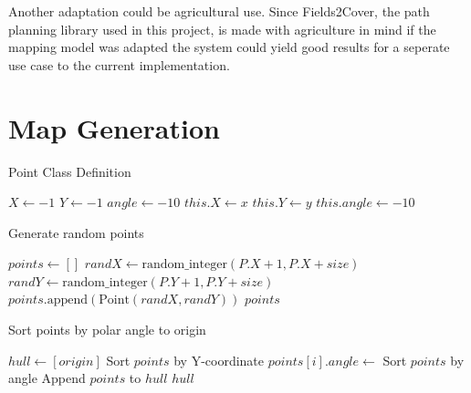 \documentclass[final]{cmpreport_02}
\begin{document}
Another adaptation could be agricultural use. 
Since Fields2Cover, the path planning library used in this project, is made with agriculture in mind if the mapping model was adapted the system could yield good results for a seperate use case to the current implementation.



\clearpage



\appendix
\clearpage

\section{Map Generation}

\begin{algorithm}[h!]
	\caption{Point Class Definition}
	\label{mg:point class}
	\begin{algorithmic}[1]
		\State $X \gets -1$ 
		\State $Y \gets -1$ 
		\State $angle \gets -10$ 
		\State $this.X \gets x$
		\State $this.Y \gets y$
		\State $this.angle \gets -10$ 
		\EndProcedure
		\EndProcedure
	\end{algorithmic}
\end{algorithm}

\begin{algorithm}[h!]
	\caption{Generate random points}
	\label{mg:genPoints}
	\begin{algorithmic}[1]
		\State $points \gets []$
		\State $randX \gets \text{random\_integer}(P.X + 1, P.X + size)$
		\State $randY \gets \text{random\_integer}(P.Y + 1, P.Y + size)$
		\State $points.\text{append}(\text{Point}(randX, randY))$
		\EndFor
		\State \Return $points$
		\EndFunction
	\end{algorithmic}
\end{algorithm}

\begin{algorithm}[h!]
	\caption{Sort points by polar angle to origin}
	\label{mg:sortPoints}
	\begin{algorithmic}[1]
		\State $hull \gets [origin]$
		\State Sort $points$ by Y-coordinate
		\State $points[i].angle \gets$ 
		\EndFor
		\State Sort $points$ by angle
		\State Append $points$ to $hull$
		\State \Return $hull$
		\EndFunction
	\end{algorithmic}
\end{algorithm}
\end{document}
